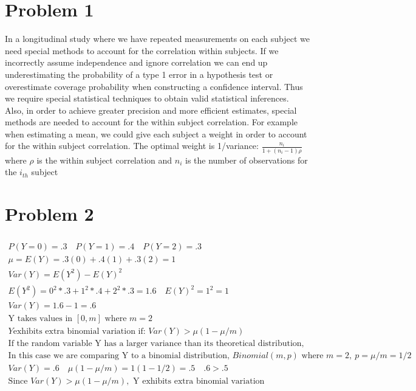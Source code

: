 \documentclass{article}
\begin{document}
\begin{flushleft}

\section*{Problem 1}
In a longitudinal study where we have repeated measurements on each subject we need special methods to account for the correlation within subjects. If we incorrectly assume independence and ignore correlation we can end up underestimating the probability of a type 1 error in a hypothesis test or overestimate coverage probability when constructing a confidence interval. Thus we require special statistical techniques to obtain valid statistical inferences.\\
Also, in order to achieve greater precision and more efficient estimates, special methods are needed to account for the within subject correlation. For example when estimating a mean, we could give each subject a weight in order to account for the within subject correlation. The optimal weight is 1/variance: $\frac{n_i}{1+(n_i-1)\rho}$\\
where $\rho$ is the within subject correlation and $n_i$ is the number of observations for the $i_{th}$ subject
\section*{Problem 2}
\begin{multline*}\\
P(Y=0)=.3 \quad P(Y=1)=.4 \quad P(Y=2)=.3\\
\mu=E(Y)=.3(0)+.4(1)+.3(2)=1\\
Var(Y)=E(Y^2)-E(Y)^2\\
E(Y^2)=0^2*.3+1^2*.4+2^2*.3=1.6 \quad E(Y)^2=1^2=1\\
Var(Y)=1.6-1=.6\\
\text{Y takes values in } [0,m] \text{ where } m=2\\
Y \text{exhibits extra binomial variation if: } Var(Y)>\mu(1-\mu/m)\\
\text{If the random variable Y has a larger variance than its theoretical distribution, we have over dispersion}\\
\text{In this case we are comparing Y to a binomial distribution, } Binomial(m,p) \text{ where } m=2, \ p=\mu/m=1/2\\
Var(Y)=.6 \quad \mu(1-\mu/m)=1(1-1/2)=.5 \quad .6>.5\\
\text{Since } Var(Y)> \mu(1-\mu/m), \text{ Y exhibits extra binomial variation}\\
\end{multline*}

\end{flushleft}
\end{document}
